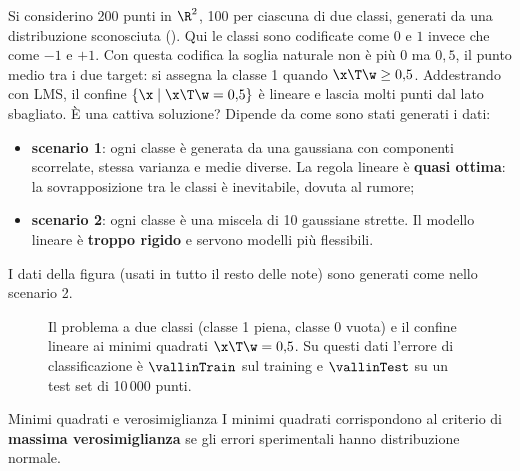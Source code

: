 Si considerino 200 punti in $\R^2$, 100 per ciascuna di due classi, generati da una distribuzione sconosciuta
(). Qui le classi sono codificate come $0$ e $1$ invece che come $-1$ e $+1$. Con questa
codifica la soglia naturale non è più 0 ma $0{,}5$, il punto medio tra i due target: si assegna la classe 1 quando
$\x\T\w\ge0{,}5$. Addestrando con LMS, il confine $\{\x\mid\x\T\w = 0{,}5\}$ è lineare e lascia molti punti dal
lato sbagliato. È una cattiva soluzione? Dipende da come sono stati generati i dati:
\begin{itemize}
  \item \textbf{scenario 1}: ogni classe è generata da una gaussiana con componenti scorrelate, stessa varianza e
        medie diverse. La regola lineare è \textbf{quasi ottima}: la sovrapposizione tra le classi è
        inevitabile, dovuta al rumore;
  \item \textbf{scenario 2}: ogni classe è una miscela di 10 gaussiane strette. Il modello lineare è
        \textbf{troppo rigido} e servono modelli più flessibili.
\end{itemize}
I dati della figura (usati in tutto il resto delle note) sono generati come nello scenario 2.

\begin{figure}[ht]
\centering
{}
\caption{Il problema a due classi (classe 1 piena, classe 0 vuota) e il confine lineare ai minimi quadrati
$\x\T\w=0{,}5$. Su questi dati l'errore di classificazione è $\vallinTrain$ sul training e $\vallinTest$ su un
test set di 10\,000 punti.}
\label{fig:htf-lineare}
\end{figure}

\begin{proprieta}{Minimi quadrati e verosimiglianza}
I minimi quadrati corrispondono al criterio di \textbf{massima verosimiglianza} se gli errori sperimentali hanno
distribuzione normale.
\end{proprieta}

